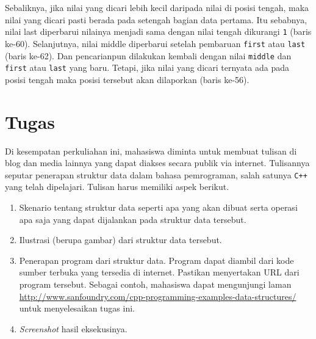 Sebaliknya, jika nilai yang dicari lebih kecil daripada nilai di posisi tengah, maka nilai yang dicari pasti berada pada setengah bagian data pertama. Itu sebabnya, nilai last diperbarui nilainya menjadi sama dengan nilai tengah dikurangi \texttt{1} (baris ke-60). Selanjutnya, nilai middle diperbarui setelah pembaruan \texttt{first} atau \texttt{last} (baris ke-62). Dan pencarianpun dilakukan kembali dengan nilai \texttt{middle} dan \texttt{first} atau \texttt{last} yang baru. Tetapi, jika nilai yang dicari ternyata ada pada posisi tengah maka posisi tersebut akan dilaporkan (baris ke-56).

\scriptsize

\normalsize

\chapter{Tugas}
Di kesempatan perkuliahan ini, mahasiswa diminta untuk membuat tulisan di blog dan media lainnya yang dapat diakses secara publik via internet. Tulisannya seputar penerapan struktur data dalam bahasa pemrograman, salah satunya \texttt{C++} yang telah dipelajari. Tulisan harus memiliki aspek berikut.
\begin{enumerate}
\item Skenario tentang struktur data seperti apa yang akan dibuat serta operasi apa saja yang dapat dijalankan pada struktur data tersebut.
\item Ilustrasi (berupa gambar) dari struktur data tersebut.
\item Penerapan program dari struktur data. Program dapat diambil dari kode sumber terbuka yang tersedia di internet. Pastikan menyertakan URL dari program tersebut. Sebagai contoh, mahasiswa dapat mengunjungi laman \url{http://www.sanfoundry.com/cpp-programming-examples-data-structures/} untuk menyelesaikan tugas ini.
\item \textit{Screenshot} hasil eksekusinya.
\end{enumerate} 




